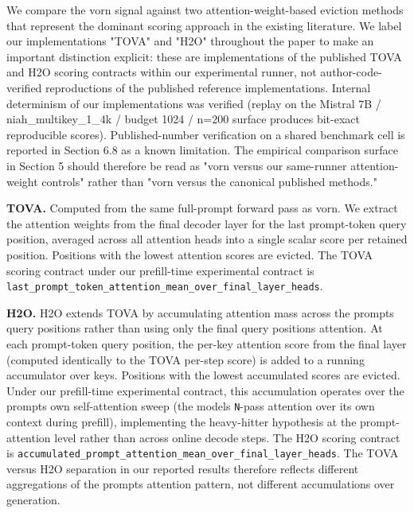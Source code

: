 \documentclass[10pt]{article}
\begin{document}
We compare the vorn signal against two attention-weight-based eviction
methods that represent the dominant scoring approach in the existing
literature. We label our implementations "TOVA" and "H2O"
throughout the paper to make an important distinction explicit: these
are implementations of the published TOVA and H2O scoring contracts
within our experimental runner, not author-code-verified reproductions
of the published reference implementations. Internal determinism of our
implementations was verified (replay on the Mistral 7B /
niah\_multikey\_1\_4k / budget 1024 / n=200 surface produces bit-exact
reproducible scores). Published-number verification on a shared
benchmark cell is reported in Section 6.8 as a known limitation. The
empirical comparison surface in Section 5 should therefore be read as
"vorn versus our same-runner attention-weight controls" rather than
"vorn versus the canonical published methods."

\textbf{TOVA.} Computed from the same full-prompt forward pass as
vorn. We extract the attention weights from the final decoder layer for
the last prompt-token query position, averaged across all attention
heads into a single scalar score per retained position. Positions with
the lowest attention scores are evicted. The TOVA scoring contract
under our prefill-time experimental contract is
\texttt{last\_prompt\_token\_attention\_mean\_over\_final\_layer\_heads}.

\textbf{H2O.} H2O extends TOVA by accumulating
attention mass across the prompt\textquotesingle s query positions
rather than using only the final query position\textquotesingle s
attention. At each prompt-token query position, the per-key attention
score from the final layer (computed identically to the TOVA
per-step score) is added to a running accumulator over keys. Positions
with the lowest accumulated scores are evicted. Under our prefill-time
experimental contract, this accumulation operates over the
prompt\textquotesingle s own self-attention sweep (the
model\textquotesingle s \texttt{N}-pass attention over its own context
during prefill), implementing the heavy-hitter hypothesis at the
prompt-attention level rather than across online decode steps. The
H2O scoring contract is
\texttt{accumulated\_prompt\_attention\_mean\_over\_final\_layer\_heads}.
The TOVA versus H2O separation in our reported results
therefore reflects different aggregations of the
prompt\textquotesingle s attention pattern, not different accumulations
over generation.
\end{document}

